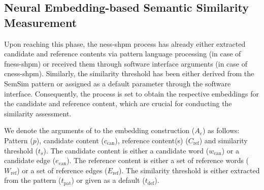 \documentclass[11pt]{scrreprt}
\begin{document}
%
%


\subsection{Neural Embedding-based Semantic Similarity Measurement}
\label{sec:neural-embedding-based-semantic-similarity-measurement}
Upon reaching this phase, the \gls{ness-shpm} process has already either extracted candidate and reference contents via pattern language processing (in case of \gls{fness-shpm}) or received them through software interface arguments (in case of \gls{cness-shpm}). Similarly, the similarity threshold has been either derived from the SemSim pattern or assigned as a default parameter through the software interface. Consequently, the process is set to obtain the respective embeddings for the candidate and reference content, which are crucial for conducting the similarity assessment.

We denote the arguments of to the embedding construction (\(A_e\)) as follows:
Pattern (\(p\)), candidate content (\(c_\text{can}\)), reference content(s) (\(C_\text{ref}\)) and similarity threshold (\(t_s\)). The candidate content is either a candidate word (\(w_\text{can}\)) or a candidate edge (\(e_\text{can}\)). The reference content is either a set of reference words (\(W_\text{ref}\)) or a set of reference edges (\(E_\text{ref}\)). The similarity threshold is either extracted from the pattern (\(t_\text{pat}\)) or given as a default (\(t_\text{def}\)).
\end{document}
